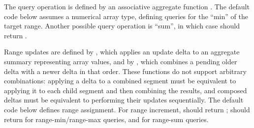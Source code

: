 The query operation is defined by an associative aggregate function . The default code below assumes a numerical array type, defining queries for the ``min'' of the target range. Another possible query operation is ``sum'', in which case  should return .

Range updates are defined by , which applies an update delta  to an aggregate summary  representing  array values, and by , which combines a pending older delta with a newer delta in that order. These functions do not support arbitrary combinations: applying a delta to a combined segment must be equivalent to applying it to each child segment and then combining the results, and composed deltas must be equivalent to performing their updates sequentially. The default code below defines range assignment. For range increment,  should return ;  should return  for range-min/range-max queries, and  for range-sum queries.

